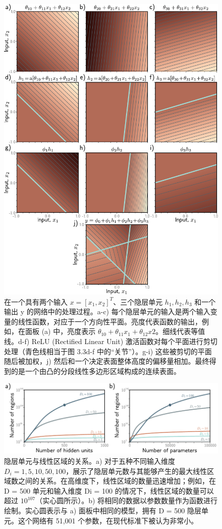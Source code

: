 \documentclass[lang=cn,newtx,10pt,scheme=chinese]{elegantbook}
\begin{document}
\begin{figure}[ht!]
	\centering
	\includegraphics[width=0.7\linewidth]{PDFFigures/UDLChap3PDF/ShallowBuildUp2D.pdf}
\caption{在一个具有两个输入 \(x = [x_1,x_2]^T\)、三个隐层单元 \(h_1,h_2,h_3\) 和一个输出 y 的网络中的处理过程。a-c) 每个隐层单元的输入是两个输入变量的线性函数，对应于一个方向性平面。亮度代表函数的输出，例如，在面板 (a) 中，亮度表示 \(\theta_10 + \theta_{11}x_1 + \theta_{12} x2\)。细线代表等值线。d-f) ReLU (Rectified Linear Unit) 激活函数对每个平面进行剪切处理（青色线相当于图 3.3d-f 中的“关节”）。g-i) 这些被剪切的平面随后被加权，j) 然后和一个决定表面整体高度的偏移量相加。最终得到的是一个由凸的分段线性多边形区域构成的连续表面。}
\end{figure}

\begin{figure}[ht!]
	\centering
	\includegraphics[width=0.7\linewidth]{PDFFigures/UDLChap3PDF/ShallowRegions.pdf}
\caption{隐层单元与线性区域的关系。a) 对于五种不同输入维度 \(D_i = {1, 5, 10, 50, 100}\)，展示了隐层单元数与其能够产生的最大线性区域数之间的关系。在高维度下，线性区域的数量迅速增加；例如，在 D = 500 单元和输入维度 Di = 100 的情况下，线性区域的数量可以超过 $10^107$（实心圆所示）。b) 将相同的数据以参数数量作为函数进行绘制。实心圆表示与 a) 面板中相同的模型，拥有 D = 500 隐层单元。这个网络有 51,001 个参数，在现代标准下被认为非常小。}
\end{figure}
\end{document}
